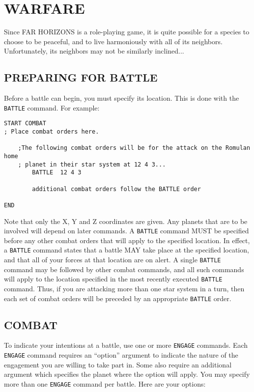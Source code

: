 \documentclass[10pt,titlepage]{article}
\begin{document}
\section{WARFARE}
\label{sec:warfare}

Since FAR HORIZONS is a role-playing game, it is quite possible for a species
to choose to be peaceful, and to live harmoniously with all of its neighbors.
Unfortunately, its neighbors may not be similarly inclined...


\subsection{PREPARING FOR BATTLE}
\label{sec:preparingforbattle}


Before a battle can begin, you must specify its location.  This is done with
the \texttt{BATTLE} command.  For example:

\begin{verbatim}
START COMBAT
; Place combat orders here.

    ;The following combat orders will be for the attack on the Romulan home
    ; planet in their star system at 12 4 3...
        BATTLE  12 4 3

        additional combat orders follow the BATTLE order

END\end{verbatim} 

Note that only the X, Y and Z coordinates are given.  Any planets that are to
be involved will depend on later commands.  A \texttt{BATTLE} command MUST be specified
before any other combat orders that will apply to the specified location.  In
effect, a \texttt{BATTLE} command states that a battle MAY take place at the specified
location, and that all of your forces at that location are on alert.  A single
\texttt{BATTLE} command may be followed by other combat commands, and all such commands
will apply to the location specified in the most recently executed \texttt{BATTLE}
command.  Thus, if you are attacking more than one star system in a turn, then
each set of combat orders will be preceded by an appropriate \texttt{BATTLE} order.


\subsection{COMBAT}
\label{sec:combat}


To indicate your intentions at a battle, use one or more \texttt{ENGAGE} commands.  Each
\texttt{ENGAGE} command requires an ``option'' argument to indicate the nature of the
engagement you are willing to take part in.  Some also require an additional
argument which specifies the planet where the option will apply.  You may
specify more than one \texttt{ENGAGE} command per battle.  Here are your options:
\end{document}
